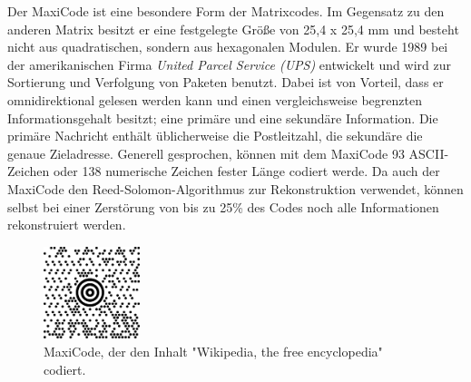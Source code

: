 Der MaxiCode ist eine besondere Form der Matrixcodes. Im Gegensatz zu den anderen Matrix besitzt er eine festgelegte Größe von 25,4 x 25,4 mm und besteht nicht aus quadratischen, sondern aus hexagonalen Modulen. Er wurde 1989 bei der amerikanischen Firma \textit{United Parcel Service (UPS)} entwickelt und wird zur Sortierung und Verfolgung von Paketen benutzt. Dabei ist von Vorteil, dass er omnidirektional gelesen werden kann und einen vergleichsweise begrenzten Informationsgehalt besitzt; eine primäre und eine sekundäre Information. Die primäre Nachricht enthält üblicherweise die Postleitzahl, die sekundäre die genaue Zieladresse. Generell gesprochen, können mit dem MaxiCode 93 ASCII-Zeichen oder 138 numerische Zeichen fester Länge codiert werde.
Da auch der MaxiCode den Reed-Solomon-Algorithmus zur Rekonstruktion verwendet, können selbst bei einer Zerstörung von bis zu 25\% des Codes noch alle Informationen rekonstruiert werden. \cite{DatalogicScanning2007} \cite{Lipinski2016} 
\pagebreak
\begin{figure}[htbp]%
	\centering
	\includegraphics[width=0.25\textwidth]{Bilder/MaxiCode.png} 
	\caption[MaxiCode]{MaxiCode, der den Inhalt "Wikipedia, the free encyclopedia" codiert.\footnotemark}
	\label{fig:maxicode}	
\end{figure}

